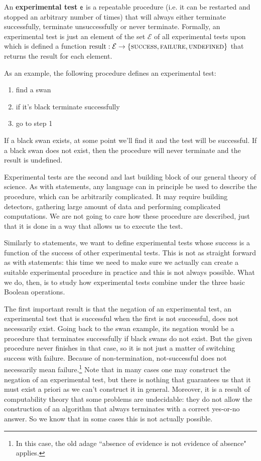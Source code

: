 \documentclass[11pt,letterpaper,fleqn]{memoir} %
\begin{document}
\begin{mathSection}
\begin{defn}\label{def_experimental_tests}
	An \textbf{experimental test} $\mathsf{e}$ is a repeatable procedure (i.e. it can be restarted and stopped an arbitrary number of times) that will always either terminate successfully, terminate unsuccessfully or never terminate. Formally, an experimental test is just an element of the set $\mathcal{E}$ of all experimental tests upon which is defined a function $\operatorname{result}: \mathcal{E} \to \{\textsc{success}, \textsc{failure}, \textsc{undefined}\}$ that returns the result for each element.
\end{defn}
\end{mathSection}

As an example, the following procedure defines an experimental test:
\begin{enumerate}
	\item find a swan
	\item if it's black terminate successfully
	\item go to step 1
\end{enumerate}
If a black swan exists, at some point we'll find it and the test will be successful. If a black swan does not exist, then the procedure will never terminate and the result is undefined.

Experimental tests are the second and last building block of our general theory of science. As with statements, any language can in principle be used to describe the procedure, which can be arbitrarily complicated. It may require building detectors, gathering large amount of data and performing complicated computations. We are not going to care how these procedure are described, just that it is done in a way that allows us to execute the test.

Similarly to statements, we want to define experimental tests whose success is a function of the success of other experimental tests. This is not as straight forward as with statements: this time we need to make sure we actually can create a suitable experimental procedure in practice and this is not always possible. What we do, then, is to study how experimental tests combine under the three basic Boolean operations.

The first important result is that the negation of an experimental test, an experimental test that is successful when the first is not successful, does not necessarily exist. Going back to the swan example, its negation would be a procedure that terminates successfully if black swans do not exist. But the given procedure never finishes in that case, so it is not just a matter of switching success with failure. Because of non-termination, not-successful does not necessarily mean failure.\footnote{In this case, the old adage ``absence of evidence is not evidence of absence" applies.} Note that in many cases one may construct the negation of an experimental test, but there is nothing that guarantees us that it must exist a priori as we can't construct it in general. Moreover, it is a result of computability theory that some problems are undecidable: they do not allow the construction of an algorithm that always terminates with a correct yes-or-no answer. So we know that in some cases this is not actually possible.
\end{document}
